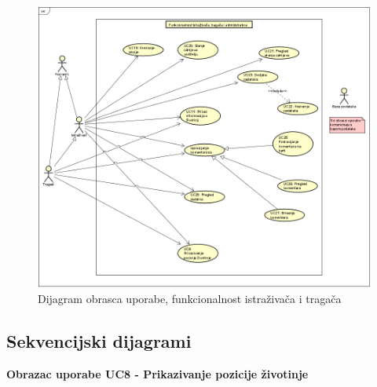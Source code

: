 				
				\begin{figure}[H]
					\includegraphics[width=\textwidth]{slike/Dijagram_obrasca_uporabe_funkcionalnost_istrazivaca_tragaca_i_administratora.PNG} %
					\caption{Dijagram obrasca uporabe, funkcionalnost istraživača i tragača }
					\label{fig:Dijagram_obrasca_uporabe_funkcionalnost_istrazivaca_tragaca_i_administratora} %
				\end{figure}		
				
				\vspace{360pt}
				
			\subsection{Sekvencijski dijagrami}
			
				\textbf{Obrazac uporabe UC8 - Prikazivanje pozicije životinje}\\
			
